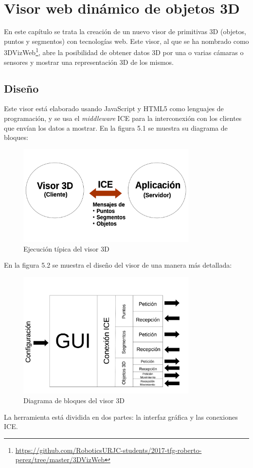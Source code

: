 \chapter{Visor web dinámico de objetos 3D}\label{cap.visor3d}
En este capítulo se trata la creación de un nuevo visor de primitivas 3D (objetos, puntos y segmentos) con tecnologías web. Este visor, al que se ha nombrado como 3DVizWeb\footnote{\url{https://github.com/RoboticsURJC-students/2017-tfg-roberto-perez/tree/master/3DVizWeb}}, abre la posibilidad de obtener datos 3D por una o varias cámaras o sensores y mostrar una representación 3D de los mismos.
\section{Diseño}
Este visor está elaborado usando JavaScript y HTML5 como lenguajes de programación, y se usa el \textit{middleware} ICE para la interconexión con los clientes que envían los datos a mostrar. En la figura 5.1 se muestra su diagrama de bloques:

\begin{figure}[H]
  \begin{center}
    \includegraphics[width=0.8\textwidth]{figures/esquemavisor.png}
		\caption{Ejecución típica del visor 3D}
		\label{fig.diseno3dviz}
		\end{center}
\end{figure}

En la figura 5.2 se muestra el diseño del visor de una manera más detallada:

\begin{figure}[H]
  \begin{center}
    \includegraphics[width=0.8\textwidth]{figures/diseno3dviz.png}
		\caption{Diagrama de bloques del visor 3D}
		\label{fig.diseno3dviz}
		\end{center}
\end{figure}
La herramienta está dividida en dos partes: la interfaz gráfica y las conexiones ICE.

